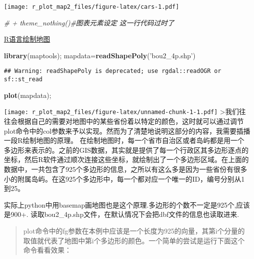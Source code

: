 \documentclass[]{article}
\newenvironment{Shaded}{\begin{snugshade}}{\end{snugshade}}
\newcommand{\KeywordTok}[1]{\textcolor[rgb]{0.13,0.29,0.53}{\textbf{#1}}}
\newcommand{\StringTok}[1]{\textcolor[rgb]{0.31,0.60,0.02}{#1}}
\newcommand{\CommentTok}[1]{\textcolor[rgb]{0.56,0.35,0.01}{\textit{#1}}}
\newcommand{\NormalTok}[1]{#1}
\begin{document}
\texttt{[image: r\_plot\_map2\_files/figure-latex/cars-1.pdf]}

\begin{Shaded}
\begin{Highlighting}[]
\CommentTok{# + theme_nothing()#图表元素设定 这一行代码过时了}
\end{Highlighting}
\end{Shaded}

\href{https://segmentfault.com/a/1190000002890587}{R语言绘制地图}

\begin{Shaded}
\begin{Highlighting}[]
\KeywordTok{library}\NormalTok{(maptools);}
\NormalTok{mapdata=}\KeywordTok{readShapePoly}\NormalTok{(}\StringTok{'bou2_4p.shp'}\NormalTok{)}
\end{Highlighting}
\end{Shaded}

\begin{verbatim}
## Warning: readShapePoly is deprecated; use rgdal::readOGR or sf::st_read
\end{verbatim}

\begin{Shaded}
\begin{Highlighting}[]
\KeywordTok{plot}\NormalTok{(mapdata);}
\end{Highlighting}
\end{Shaded}

\texttt{[image: r\_plot\_map2\_files/figure-latex/unnamed-chunk-1-1.pdf]}
\textgreater{}我们往往会根据自己的需要对地图中的某些省份着以特定的颜色，这时就可以通过调节plot命令中的col参数来予以实现。然而为了清楚地说明这部分的内容，我需要插播一段R绘制地图的原理。
在绘制地图时，每一个省市自治区或者岛屿都是用一个多边形来表示的。之前的GIS数据，其实就是提供了每一个行政区其多边形逐点的坐标，然后R软件通过顺次连接这些坐标，就绘制出了一个多边形区域。在上面的数据中，一共包含了925个多边形的信息，之所以有这么多是因为一些省份有很多小的附属岛屿。在这925个多边形中，每一个都对应一个唯一的ID，编号分别从1到25。

实际上python中用basemap画地图也是这个原理.多边形的个数不一定是925个,应该是900+.
读取bou2\_4p.shp文件，在默认情况下会把dbf文件的信息也读取进来.

\begin{quote}
plot命令中的fg参数在本例中应该是一个长度为925的向量，其第i个分量的取值就代表了地图中第i个多边形的颜色。一个简单的尝试是运行下面这个命令看看效果：
\end{quote}
\end{document}
